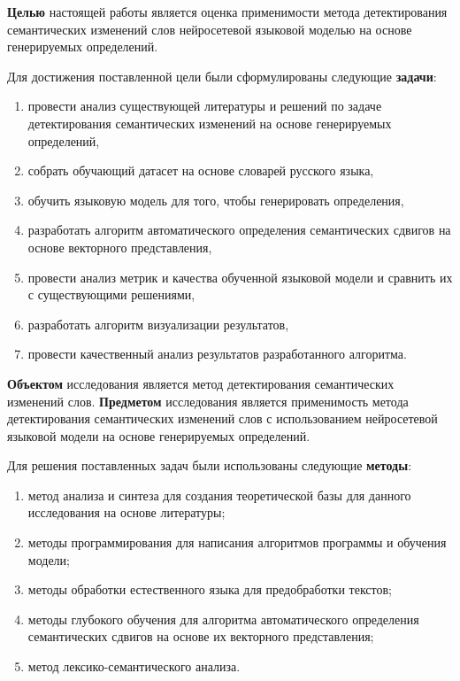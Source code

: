 \documentclass[LI,VKR]{HSEUniversity}
\begin{document}
\textbf{Целью} настоящей работы является оценка применимости метода детектирования семантических
изменений слов нейросетевой языковой моделью на основе генерируемых определений.

Для достижения поставленной цели были сформулированы следующие \textbf{задачи}:
\begin{enumerate}
    \item провести анализ существующей литературы и решений по задаче детектирования семантических
    изменений на основе генерируемых определений,
    \item собрать обучающий датасет на основе словарей русского языка,
    \item обучить языковую модель для того, чтобы генерировать определения,
    \item разработать алгоритм автоматического определения семантических сдвигов на
основе векторного представления,
    \item провести анализ метрик и качества обученной языковой модели и сравнить их с
    существующими решениями,
    \item разработать алгоритм визуализации результатов,
    \item провести качественный анализ результатов разработанного алгоритма.
\end{enumerate}

\textbf{Объектом} исследования является метод детектирования семантических изменений слов.
\textbf{Предметом} исследования является применимость метода детектирования семантических изменений
слов с использованием нейросетевой языковой модели на основе генерируемых определений.

Для решения поставленных задач были использованы следующие \textbf{методы}:
\begin{enumerate}
    \item метод анализа и синтеза для создания теоретической базы для данного исследования
на основе литературы;
    \item методы программирования для написания алгоритмов программы и обучения модели;
    \item методы обработки естественного языка для предобработки текстов;
    \item методы глубокого обучения для алгоритма автоматического определения семантических
сдвигов на основе их векторного представления;
    \item метод лексико-семантического анализа. %
\end{enumerate}
\end{document}
